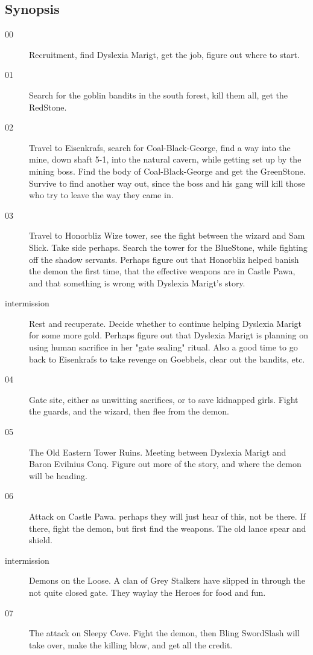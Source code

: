 \documentclass[11pt, twoside, titlepage, a4paper]{report}
\begin{document}
\subsection*{Synopsis}
\begin{description}

\item[00] Recruitment, find Dyslexia Marigt, get the job, figure out where to start.


\item[01] Search for the goblin bandits in the south forest, kill them all, get the RedStone.


\item[02] Travel to Eisenkrafs, search for Coal-Black-George, find a way into the mine, down shaft 5-1, into the natural cavern, while getting set up by the mining boss. Find the body of Coal-Black-George and get the GreenStone. Survive to find another way out, since the boss and his gang will kill those who try to leave the way they came in.


\item[03] Travel to Honorbliz Wize tower, see the fight between the wizard and Sam Slick. Take side perhaps. Search the tower for the BlueStone, while fighting off the shadow servants. Perhaps figure out that Honorbliz helped banish the demon the first time, that the effective weapons are in Castle Pawa, and that something is wrong with Dyslexia Marigt's story.


\item[intermission] Rest and recuperate. Decide whether to continue helping Dyslexia Marigt for some more gold. Perhaps figure out that Dyslexia Marigt is planning on using human sacrifice in her "gate sealing" ritual. Also a good time to go back to Eisenkrafs to take revenge on Goebbels, clear out the bandits, etc.


\item[04] Gate site, either as unwitting sacrifices, or to save kidnapped girls. Fight the guards, and the wizard, then flee from the demon.


\item[05] The Old Eastern Tower Ruins. Meeting between Dyslexia Marigt and Baron Evilnius Conq. Figure out more of the story, and where the demon will be heading.


\item[06] Attack on Castle Pawa. perhaps they will just hear of this, not be there. If there, fight the demon, but first find the weapons. The old lance spear and shield.


\item[intermission] Demons on the Loose. A clan of Grey Stalkers have slipped in through the not quite closed gate. They waylay the Heroes for food and fun.


\item[07] The attack on Sleepy Cove. Fight the demon, then Bling SwordSlash will take over, make the killing blow, and get all the credit.

\end{description}
\end{document}
